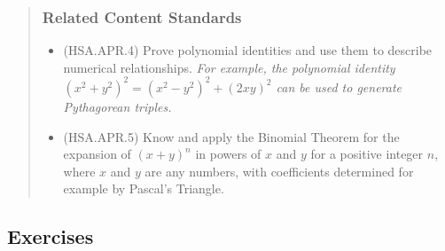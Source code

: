 \documentclass[
]{book}
\providecommand{\tightlist}{%
  \setlength{\itemsep}{0pt}\setlength{\parskip}{0pt}}
\theoremstyle{definition}
\theoremstyle{definition}
\theoremstyle{definition}
\theoremstyle{remark}
\begin{document}
\begin{quote}
\hypertarget{related-content-standards-52}{%
\subsubsection*{Related Content Standards}\label{related-content-standards-52}}

\begin{itemize}
\tightlist
\item
  (HSA.APR.4) Prove polynomial identities and use them to describe numerical relationships. \textit{For example, the polynomial identity $(x^2 + y^2)^2 = (x^2 - y^2)^2 + (2xy)^2$ can be used to generate Pythagorean triples.}
\item
  (HSA.APR.5) Know and apply the Binomial Theorem for the expansion of \((x + y)^n\) in powers of \(x\) and \(y\) for a positive integer \(n\), where \(x\) and \(y\) are any numbers, with coefficients determined for example by Pascal's Triangle.
\end{itemize}
\end{quote}

\hypertarget{exercises-32}{%
\subsection{Exercises}\label{exercises-32}}
\end{document}
